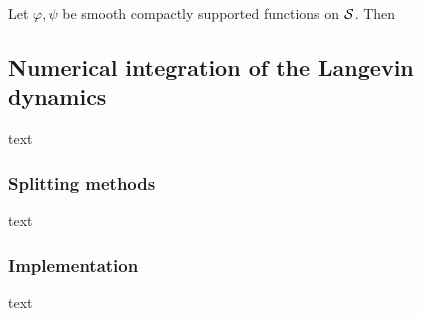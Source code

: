     \begin{lemma}
        Let $\varphi,\psi$ be smooth compactly supported functions on $\mathcal{S}$. Then
    \end{lemma}

\subsection{Numerical integration of the Langevin dynamics}
text
    \subsubsection{Splitting methods}
    text
    \subsubsection{Implementation}
    text
